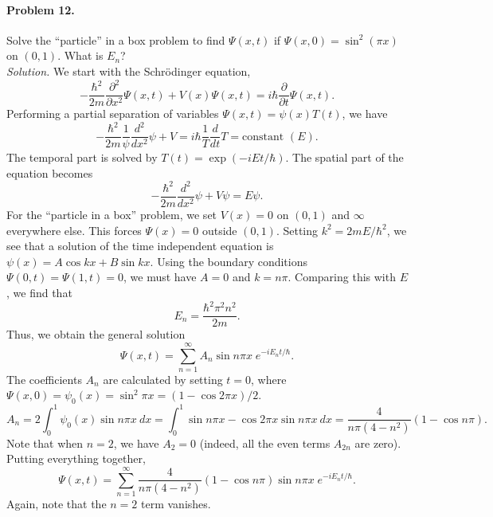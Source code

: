 \documentclass[10pt]{article}
\newcommand\ppt[1]{\frac{\partial #1}{\partial t}}
\newcommand\pp[3][]{\frac{\partial^{#1}{#2}}{\partial {#3}^{#1}}}
\newcommand\ddt[1]{\frac{d #1}{d t}}
\newcommand\dd[3][]{\frac{d^{#1}{#2}}{d {#3}^{#1}}}
\begin{document}
        \paragraph{Problem 12.} Solve the ``particle'' in a box problem to find $\Psi(x, t)$ if $\Psi(x, 0) = \sin^2(\pi x)$ on $(0, 1)$.
        What is $E_n$? \\

        \textit{Solution.} 
        We start with the Schr\"odinger equation,
        \[
                -\frac{\hbar^2}{2m}\pp[2]{}{x}\Psi(x, t) + V(x)\Psi(x, t) = i\hbar \ppt{} \Psi(x, t).
        \]
        Performing a partial separation of variables $\Psi(x, t) = \psi(x)T(t)$, we have
        \[
                -\frac{\hbar^2}{2m} \frac{1}{\psi}\dd[2]{}{x}{\psi} + V = {i\hbar} \frac{1}{T}\ddt{}T = \text{constant } (E).
        \]
        The temporal part is solved by $T(t) = \exp(-iEt/\hbar)$.
        The spatial part of the equation becomes
        \[
                -\frac{\hbar^2}{2m}\dd[2]{}{x}{\psi} + V\psi = E\psi.
        \]
        For the ``particle in a box'' problem, we set $V(x) = 0$ on $(0, 1)$ and $\infty$ everywhere else. This forces $\Psi(x) = 0$
        outside $(0, 1)$. Setting $k^2 = 2mE/\hbar^2$, we see that a solution of the time independent equation is
        $\psi(x) = A\cos{kx} + B\sin{kx}$. Using the boundary conditions $\Psi(0, t) = \Psi(1, t) = 0$, we must have
        $A = 0$ and $k = n\pi$. Comparing this with $E$, we find that
        \[
                E_n = \frac{\hbar^2\pi^2n^2}{2m}.
        \]
        Thus, we obtain the general solution
        \[
                \Psi(x, t) = \sum_{n = 1}^\infty A_n \sin{n\pi x}\; e^{-iE_n t/\hbar}.
        \]
        The coefficients $A_n$ are calculated by setting $t = 0$, where $\Psi(x, 0) = \psi_0(x) = \sin^2{\pi x} = (1 - \cos{2\pi x}) /2$.
        \[
                A_n = 2\int_0^1 \psi_0(x) \sin{n\pi x}\:dx = \int_0^1 \sin{n\pi x} - \cos{2\pi x}\sin{n \pi x}\: dx
                        = \frac{4}{n\pi(4 - n^2)}(1 - \cos{n\pi}).
        \]
        Note that when $n = 2$, we have $A_2 = 0$ (indeed, all the even terms $A_{2n}$ are zero).
        Putting everything together,
        \[
                \Psi(x, t) = \sum_{n = 1}^\infty \frac{4}{n\pi(4 - n^2)}(1 - \cos{n\pi}) \sin{n\pi x}\; e^{-iE_n t/\hbar}.
        \]
        Again, note that the $n = 2$ term vanishes.
\end{document}
